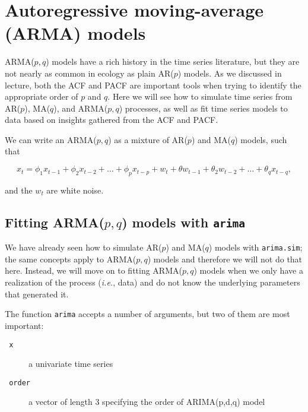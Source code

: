 \section{Autoregressive moving-average (ARMA) models}

ARMA($p,q$) models have a rich history in the time series literature, but they are not nearly as common in ecology as plain AR($p$) models.  As we discussed in lecture, both the ACF and PACF are important tools when trying to identify the appropriate order of $p$ and $q$.  Here we will see how to simulate time series from AR($p$), MA($q$), and ARMA($p,q$) processes, as well as fit time series models to data based on insights gathered from the ACF and PACF.

We can write an ARMA($p,q$) as a mixture of AR($p$) and MA($q$) models, such that

\begin{equation}\label{eqn:ARMAdefn}
x_t = \phi_1x_{t-1} + \phi_2x_{t-2} + \dots + \phi_p x_{t-p} + w_t + \theta w_{t-1} + \theta_2 w_{t-2} + \dots + \theta_q x_{t-q},
\end{equation}

\noindent and the $w_t$ are white noise.

\subsection{Fitting ARMA($p,q$) models with \texttt{arima}}

We have already seen how to simulate AR($p$) and MA($q$) models with \texttt{arima.sim}; the same concepts apply to ARMA($p,q$) models and therefore we will not do that here.  Instead, we will move on to fitting ARMA($p,q$) models when we only have a realization of the process (\emph{i.e.}, data) and do not know the underlying parameters that generated it.

The function \texttt{arima} accepts a number of arguments, but two of them are most important:

\begin{description}
\item [\texttt{   x }] a univariate time series
\item [\texttt{   order }] a vector of length 3 specifying the order of ARIMA(p,d,q) model
\end{description}

